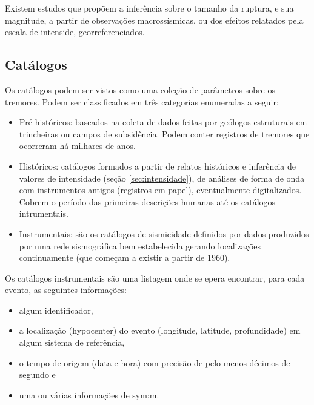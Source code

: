 Existem estudos \citep{bakun_1999} que propõem a inferência sobre o tamanho da ruptura, e sua
magnitude, a partir de observações macrossísmicas, ou dos efeitos relatados pela escala de intenside, georreferenciados.


\subsection{Catálogos}
\label{sec:catalogos}

Os catálogos podem ser vistos como uma coleção de parâmetros sobre os tremores. 
Podem ser classificados em três categorias \citep{woessner_2010} enumeradas a seguir:

\begin{itemize}\setlength{\itemsep}{0em}
	\item Pré-históricos: baseados na coleta de dados feitas por 
	geólogos estruturais em trincheiras ou campos de subsidência. Podem conter registros de tremores que ocorreram 
	há milhares de anos.
	\item Históricos: catálogos formados a partir de relatos históricos e inferência de valores de intensidade
	(seção \ref{sec:intensidade}), de análises de forma de onda com instrumentos antigos (registros em papel), eventualmente
	digitalizados.
	Cobrem o período das primeiras descrições humanas até os catálogos intrumentais.
	\item Instrumentais: são os catálogos de sismicidade definidos por dados produzidos por uma rede sismográfica bem estabelecida
	 gerando localizações continuamente (que começam a existir a partir de 1960).
\end{itemize} 

Os catálogos instrumentais são uma listagem onde se epera encontrar, para cada evento, as
seguintes informações:

\begin{itemize}\setlength{\itemsep}{0em}
	\item algum identificador,
	\item a localização (\gls{hypocenter}) do evento (longitude, latitude, profundidade) em algum sistema de referência,
	\item o tempo de origem (data e hora) com precisão de pelo menos décimos de segundo e
	\item uma ou várias informações de \glsdesc{sym:m}.
\end{itemize} 

